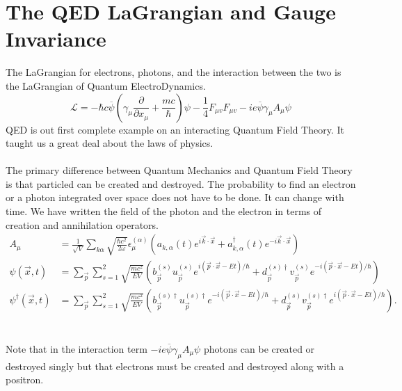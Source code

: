 \documentclass{report}
\begin{document}
\section{The QED LaGrangian and Gauge Invariance}
The LaGrangian for electrons, photons, and the interaction between the two is the LaGrangian of Quantum ElectroDynamics.
\begin{equation}
	\mathcal{L} = -\hbar c \overline{\psi} \left( \gamma_{\mu} \frac{ \partial  }{ \partial x_{\mu} } + \frac{mc}{\hbar}  \right) \psi - \frac{1}{4}F_{\mu v} F_{\mu v} - ie \overline{\psi}\gamma_{\mu}A_{\mu}\psi
\end{equation}
QED is out first complete example on an interacting Quantum Field Theory. It taught us a great deal about the laws of physics.
\\
\\
The primary difference between Quantum Mechanics and Quantum Field Theory is that particled can be created and destroyed. The probability to find an electron or a photon integrated over space does not have to be done. It can change with time. We have written the field of the photon and the electron in terms of creation and annihilation operators.
\begin{align*}
	A_{\mu}                                 & = \frac{1}{\sqrt{V} } \sum_{k \alpha} \sqrt{\frac{\hbar c^2}{2 \omega}} \epsilon^{(\alpha)}_{\mu} \left( a_{k, \alpha} \left( t \right) e^{i\vec{k}\cdot \vec{x}} + a^{\dagger}_{k, \alpha} \left( t \right) e^{-i \vec{k} \cdot \vec{x}} \right)                                                              \\
	\psi \left( \vec{x}, t \right)          & = \sum_{\vec{p}} \sum_{s=1}^{2} \sqrt{\frac{mc^2}{EV}}  \left( b^{(s)}_{\vec{p}} u^{(s)}_{\vec{p}} e^{i\left( \vec{p} \cdot \vec{x} - Et \right) / \hbar} + d^{\left( s \right) \dagger}_{\vec{p}} v^{(s)}_{\vec{p}} e^{-i\left( \vec{p} \cdot \vec{x} - Et \right) / \hbar} \right)                           \\
	\psi^{\dagger}\left( \vec{x}, t \right) & = \sum_{\vec{p}} \sum_{s=1}^{2} \sqrt{\frac{mc^2}{EV}} \left( b^{\left( s \right) \dagger}_{\vec{p}} u^{\left( s \right) \dagger}_{\vec{p}} e^{-i\left( \vec{p} \cdot \vec{x} - Et \right) / \hbar} +d^{(s)}_{\vec{p}} v^{(s)\dagger}_{\vec{p}} e^{i\left( \vec{p} \cdot \vec{x} - Et \right) / \hbar} \right)
	.\end{align*}
\\
\\
Note that in the interaction term $\displaystyle -ie \overline{\psi}\gamma_{\mu}A_{\mu}\psi$ photons can be created or destroyed singly but that electrons must be created and destroyed along with a positron.
\end{document}
